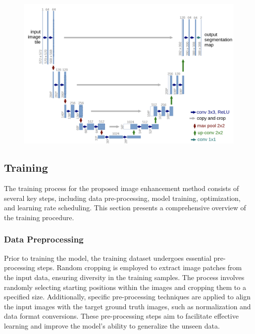 \documentclass{article}
\begin{document}

\begin{figure}[H]
  \centering
  \includegraphics[width=\textwidth]{UnetArch.png}
\end{figure}
\subsection{Training}
The training process for the proposed image enhancement method consists of several key steps, including data pre-processing,
model training, optimization, and learning rate scheduling. This section presents a comprehensive overview of the training procedure.

\subsubsection{Data Preprocessing}
Prior to training the model, the training dataset undergoes essential pre-processing steps. Random cropping is employed to extract image
patches from the input data, ensuring diversity in the training samples. The process involves randomly selecting starting positions
within the images and cropping them to a specified size. Additionally, specific pre-processing techniques are applied to align the input images with the target ground truth
images, such as normalization and data format conversions. These pre-processing steps aim to facilitate effective learning and 
improve the model's ability to generalize the unseen data. 
\end{document}
